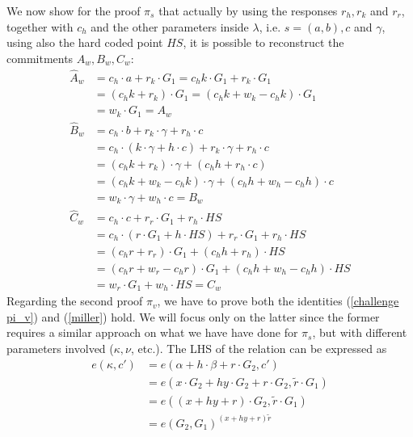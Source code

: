 \documentclass[twocolumn]{article}
\begin{document}
We now show for the proof $\pi_s$ that actually by using the responses $r_h, r_k$ and $r_r$, together with $c_h$ and the other parameters inside $\lambda$, i.e. $s=(a,b), c$ and $\gamma$, using also the hard coded point $HS$, it is possible to reconstruct the commitments $A_w, B_w, C_w$:
\begin{align*}
    \widehat{A}_w   &= c_h\cdot a + r_k\cdot G_1 = c_h k \cdot G_1 + r_k \cdot G_1 \\
                    &= (c_h k + r_k)\cdot G_1 = (c_h k + w_k - c_h k)\cdot G_1 \\
                    &= w_k\cdot G_1 = A_w \\
    \widehat{B}_w   &= c_h\cdot b + r_k\cdot \gamma + r_h\cdot c \\
                    &= c_h\cdot (k\cdot \gamma + h\cdot c) + r_k\cdot\gamma + r_h\cdot c \\
                    &= (c_h k + r_k) \cdot\gamma + (c_h h + r_h\cdot c) \\
                    &= (c_h k + w_k - c_h k ) \cdot\gamma + (c_h h + w_h - c_h h)\cdot c \\
                    &= w_k\cdot\gamma + w_h\cdot c = B_w \\
    \widehat{C}_w   &= c_h\cdot c + r_r\cdot G_1 + r_h\cdot HS \\
                    &= c_h\cdot (r\cdot G_1 + h\cdot HS) + r_r\cdot G_1 + r_h\cdot HS \\
                    &= (c_h r + r_r)\cdot G_1 + (c_h h + r_h)\cdot HS \\
                    &= (c_h r + w_r - c_h r)\cdot G_1 + (c_h h + w_h - c_h h)\cdot HS \\
                    &= w_r \cdot G_1 + w_h\cdot HS = C_w
\end{align*} 
Regarding the second proof $\pi_v$, we have to prove both the identities (\ref{challenge pi_v}) and (\ref{miller}) hold. We will focus only on the latter since the former requires a similar approach on what we have have done for $\pi_s$, but with different parameters involved ($\kappa, \nu$, etc.). The LHS of the relation can be expressed as
\begin{align*}
    e(\kappa, c') &= e(\alpha + h\cdot\beta + r\cdot G_2, c') \\
    &= e(x\cdot G_2 + hy\cdot G_2  + r\cdot G_2,\tilde{r}\cdot G_1) \\
    &= e((x+hy+r)\cdot G_2, \tilde{r}\cdot G_1) \\
    &= e(G_2,G_1)^{(x+hy+r)\tilde{r}}
\end{align*}
\end{document}
